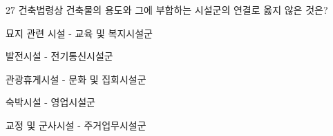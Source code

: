\begin{question}{27}
건축법령상 건축물의 용도와 그에 부합하는 시설군의 연결로 옳지 않은 것은?
\begin{choices}
  \item 묘지 관련 시설 - 교육 및 복지시설군
  \item 발전시설 - 전기통신시설군
  \item 관광휴게시설 - 문화 및 집회시설군
  \item 숙박시설 - 영업시설군
  \item 교정 및 군사시설 - 주거업무시설군
\end{choices}
\end{question}
